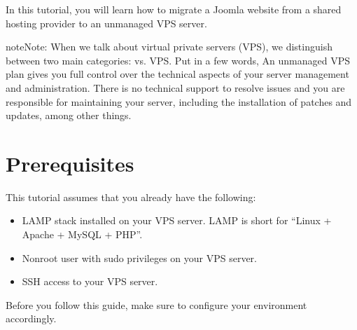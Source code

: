 \documentclass[letterpaper,10pt,english]{sphinxmanual}
\begin{document}
\sphinxAtStartPar
In this tutorial, you will learn how to migrate a Joomla website from a shared hosting provider to an unmanaged VPS server.

\begin{sphinxadmonition}{note}{Note:}
\sphinxAtStartPar
When we talk about virtual private servers (VPS), we distinguish between two main categories:  vs.  VPS. Put in a few words, An unmanaged VPS plan gives you full control over the technical aspects of your server management and administration. There is no technical support to resolve issues and you are responsible for maintaining your server, including the installation of patches and updates, among other things.
\end{sphinxadmonition}


\section{Prerequisites}
\label{\detokenize{joomla-to-vps:prerequisites}}\label{\detokenize{joomla-to-vps:requirements}}
\sphinxAtStartPar
This tutorial assumes that you already have the following:
\begin{itemize}
\item {} 
\sphinxAtStartPar
LAMP stack installed on your VPS server. LAMP is short for “Linux + Apache + MySQL + PHP”.

\item {} 
\sphinxAtStartPar
Non\sphinxhyphen{}root user with sudo privileges on your VPS server.

\item {} 
\sphinxAtStartPar
SSH access to your VPS server.

\end{itemize}

\sphinxAtStartPar
Before you follow this guide, make sure to configure your environment accordingly.
\end{document}

